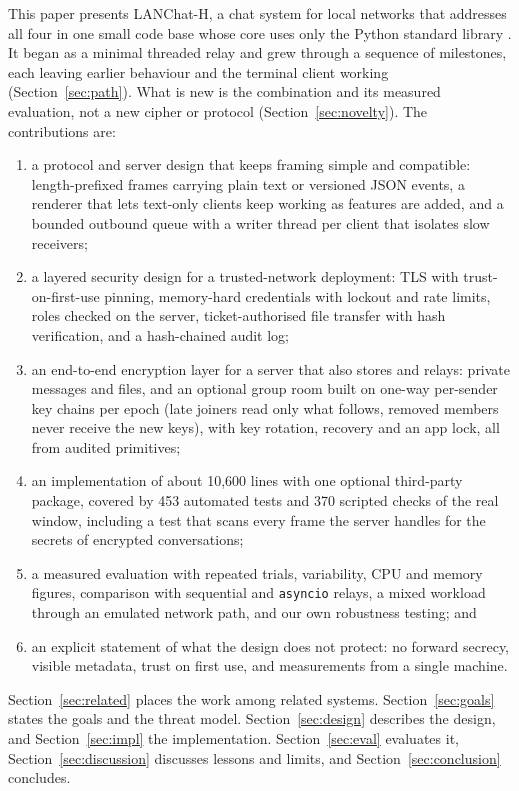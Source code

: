 \documentclass[conference]{IEEEtran}
\newcommand{\code}[1]{\texttt{#1}}
\begin{document}
This paper presents LANChat-H, a chat system for local networks that addresses all four in one small code base whose core uses only the Python standard library \cite{pysocket,pythreading}. It began as a minimal threaded relay and grew through a sequence of milestones, each leaving earlier behaviour and the terminal client working (Section~\ref{sec:path}). What is new is the combination and its measured evaluation, not a new cipher or protocol (Section~\ref{sec:novelty}). The contributions are:
\begin{enumerate}
  \item a protocol and server design that keeps framing simple and compatible: length-prefixed frames carrying plain text or versioned JSON events, a renderer that lets text-only clients keep working as features are added, and a bounded outbound queue with a writer thread per client that isolates slow receivers;
  \item a layered security design for a trusted-network deployment: TLS with trust-on-first-use pinning, memory-hard credentials with lockout and rate limits, roles checked on the server, ticket-authorised file transfer with hash verification, and a hash-chained audit log;
  \item an end-to-end encryption layer for a server that also stores and relays: private messages and files, and an optional group room built on one-way per-sender key chains per epoch (late joiners read only what follows, removed members never receive the new keys), with key rotation, recovery and an app lock, all from audited primitives;
  \item an implementation of about 10,600 lines with one optional third-party package, covered by 453 automated tests and 370 scripted checks of the real window, including a test that scans every frame the server handles for the secrets of encrypted conversations;
  \item a measured evaluation with repeated trials, variability, CPU and memory figures, comparison with sequential and \code{asyncio} relays, a mixed workload through an emulated network path, and our own robustness testing; and
  \item an explicit statement of what the design does not protect: no forward secrecy, visible metadata, trust on first use, and measurements from a single machine.
\end{enumerate}
Section~\ref{sec:related} places the work among related systems. Section~\ref{sec:goals} states the goals and the threat model. Section~\ref{sec:design} describes the design, and Section~\ref{sec:impl} the implementation. Section~\ref{sec:eval} evaluates it, Section~\ref{sec:discussion} discusses lessons and limits, and Section~\ref{sec:conclusion} concludes.
\end{document}
